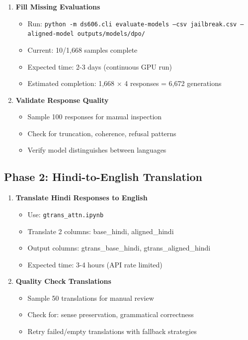 \documentclass[11pt,a4paper]{article}
\begin{document}
\begin{enumerate}
    \item[\textcolor{pending}{▶}] \textbf{Fill Missing Evaluations}
    \begin{itemize}
        \item Run: \texttt{python -m ds606.cli evaluate-models --csv jailbreak.csv --aligned-model outputs/models/dpo/}
        \item Current: 10/1,668 samples complete
        \item Expected time: 2-3 days (continuous GPU run)
        \item Estimated completion: 1,668 × 4 responses = 6,672 generations
    \end{itemize}

    \item[\textcolor{pending}{▶}] \textbf{Validate Response Quality}
    \begin{itemize}
        \item Sample 100 responses for manual inspection
        \item Check for truncation, coherence, refusal patterns
        \item Verify model distinguishes between languages
    \end{itemize}
\end{enumerate}

\subsection{Phase 2: Hindi-to-English Translation}

\begin{enumerate}
    \item[\textcolor{pending}{▶}] \textbf{Translate Hindi Responses to English}
    \begin{itemize}
        \item Use: \texttt{gtrans\_attn.ipynb}
        \item Translate 2 columns: base\_hindi, aligned\_hindi
        \item Output columns: gtrans\_base\_hindi, gtrans\_aligned\_hindi
        \item Expected time: 3-4 hours (API rate limited)
    \end{itemize}

    \item[\textcolor{pending}{▶}] \textbf{Quality Check Translations}
    \begin{itemize}
        \item Sample 50 translations for manual review
        \item Check for: sense preservation, grammatical correctness
        \item Retry failed/empty translations with fallback strategies
    \end{itemize}
\end{enumerate}
\end{document}
